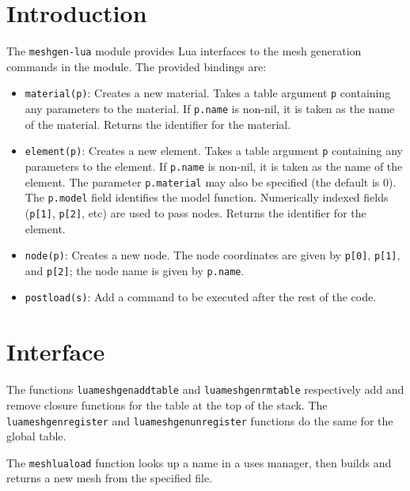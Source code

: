 
\section{Introduction}

The {\tt{}meshgen-lua} module provides Lua interfaces to the
mesh generation commands in the module.  The provided bindings are:
\begin{itemize}

  \item {\tt{}material(p)}: Creates a new material.
    Takes a table argument {\tt{}p} containing
    any parameters to the material.  If {\tt{}p.name} is non-nil,
    it is taken as the name of the material.
    Returns the identifier for the material.

  \item {\tt{}element(p)}: Creates a new element.
    Takes a table argument {\tt{}p} containing
    any parameters to the element.  If {\tt{}p.name} is non-nil,
    it is taken as the name of the element.
    The parameter {\tt{}p.material} may also be specified
    (the default is 0).  The {\tt{}p.model} field identifies
    the model function.  Numerically indexed fields
    ({\tt{}p[1]}, {\tt{}p[2]}, etc) are used to pass nodes.
    Returns the identifier for the element.

  \item {\tt{}node(p)}: Creates a new node.
    The node coordinates are given by {\tt{}p[0]}, {\tt{}p[1]}, and {\tt{}p[2]};
    the node name is given by {\tt{}p.name}.

  \item {\tt{}postload(s)}: Add a command to be executed after the
    rest of the code.

\end{itemize}


\section{Interface}

The functions {\tt{}lua{}meshgen{}add{}table} and {\tt{}lua{}meshgen{}rm{}table}
respectively add and remove closure functions for the table at the
top of the stack.  The {\tt{}lua{}meshgen{}register} and {\tt{}lua{}meshgen{}unregister}
functions do the same for the global table.

The {\tt{}mesh{}lua{}load} function looks up a name in a uses manager,
then builds and returns a new mesh from the specified file.


